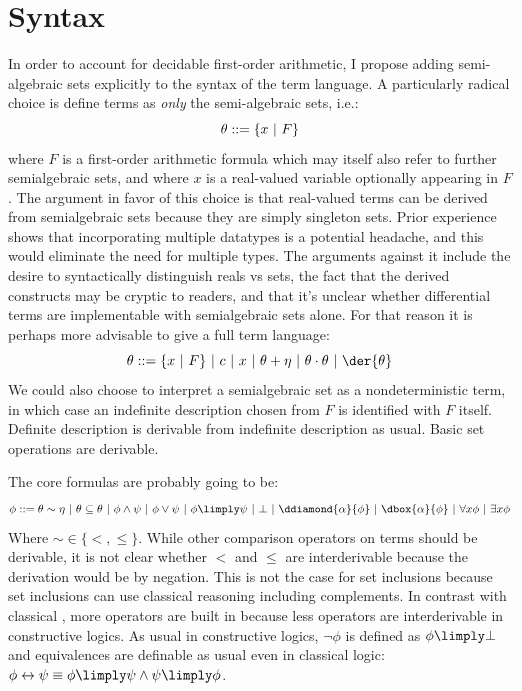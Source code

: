 \documentclass[12pt]{cmuthesis}
\theoremstyle{definition}
\theoremstyle{remark}
\newcommand{\bebecomes}{\mathrel{::=}}
\newcommand{\alternative}{~|~}
\newcommand{\lequiv}{\leftrightarrow}
\begin{document}
\section{Syntax}
In order to account for decidable first-order arithmetic, I propose adding semi-algebraic sets explicitly to the syntax of the term language.
A particularly radical choice is define terms as \emph{only} the semi-algebraic sets, i.e.:
\[\theta \bebecomes \semiset{x}{F}\]
where $F$ is a first-order arithmetic formula which may itself also refer to further semialgebraic sets, and where $x$ is a real-valued variable optionally appearing in $F$.
The argument in favor of this choice is that real-valued terms can be derived from semialgebraic sets because they are simply singleton sets.
Prior experience shows that incorporating multiple datatypes is a potential headache, and this would eliminate the need for multiple types.
The arguments against it include the desire to syntactically distinguish reals vs sets, the fact that the derived constructs may be cryptic to readers, and that it's unclear whether differential terms are implementable with semialgebraic sets alone.
For that reason it is perhaps more advisable to give a full term language:
\[\theta \bebecomes \semiset{x}{F} \alternative c \alternative x \alternative \theta + \eta \alternative \theta \cdot \theta \alternative \der{\theta}\]
We could also choose to interpret a semialgebraic set as a nondeterministic term, in which case an indefinite description chosen from $F$ is identified with $F$ itself.
Definite description is derivable from indefinite description as usual.
Basic set operations are derivable.

The core formulas are probably going to be:
\[\phi \bebecomes \theta \sim \eta \alternative \theta \subseteq \theta \alternative \phi \land \psi \alternative \phi \lor \psi \alternative \phi \limply \psi \alternative \bot \alternative \ddiamond{\alpha}{\phi} \alternative \dbox{\alpha}{\phi} \alternative \forall{x}{\phi} \alternative \exists{x}{\phi}\]
Where $\sim \in \{<, \leq\}$.
While other comparison operators on terms should be derivable, it is not clear whether $<$ and $\leq$ are interderivable because the derivation would be by negation.
This is not the case for set inclusions because set inclusions can use classical reasoning including complements.
In contrast with classical \dL, more operators are built in because less operators are interderivable in constructive logics.
As usual in constructive logics, $\neg \phi$ is defined as $\phi \limply \bot$ and equivalences are definable as usual even in classical logic: $\phi \lequiv \psi \equiv \phi \limply \psi \land \psi \limply \phi$.
\end{document}
